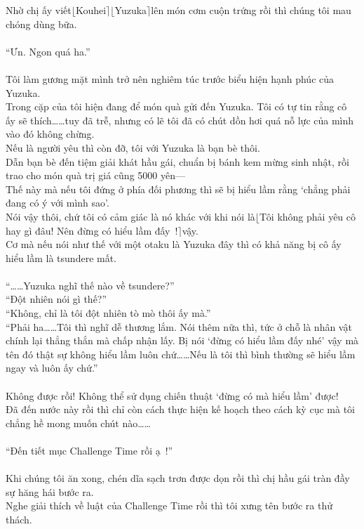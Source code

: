 \documentclass[12pt,a4paper, twosides]{book}
\begin{document}
Nhờ chị ấy viết$\lfloor$Kouhei$\rceil$$\lfloor$Yuzuka$\rceil$lên món cơm cuộn trứng rồi thì chúng tôi mau chóng dùng bữa.\\
\\
“Ưn. Ngon quá ha.”\\
\\
Tôi làm gương mặt mình trở nên nghiêm túc trước biểu hiện hạnh phúc của Yuzuka.\\
Trong cặp của tôi hiện đang để món quà gửi đến Yuzuka. Tôi có tự tin rằng cô ấy sẽ thích……tuy đã trễ, nhưng có lẽ tôi đã có chút dồn hơi quá nỗ lực của mình vào đó không chừng.\\
Nếu là người yêu thì còn đỡ, tôi với Yuzuka là bạn bè thôi.\\
Dẫn bạn bè đến tiệm giải khát hầu gái, chuẩn bị bánh kem mừng sinh nhật, rồi trao cho món quà trị giá cũng 5000 yên—\\
Thế này mà nếu tôi đứng ở phía đối phương thì sẽ bị hiểu lầm rằng ‘chẳng phải đang có ý với mình sao’.\\
Nói vậy thôi, chứ tôi có cảm giác là nó khác với khi nói là$\lfloor$Tôi không phải yêu cô hay gì đâu! Nên đừng có hiểu lầm đấy~!$\rceil$vậy.\\
Cơ mà nếu nói như thế với một otaku là Yuzuka đây thì có khả năng bị cô ấy hiểu lầm là tsundere mất.\\
\\
“……Yuzuka nghĩ thế nào về tsundere?”\\
“Đột nhiên nói gì thế?”\\
“Không, chỉ là tôi đột nhiên tò mò thôi ấy mà.”\\
“Phải ha……Tôi thì nghĩ dễ thương lắm. Nói thêm nữa thì, tức ở chỗ là nhân vật chính lại thẳng thắn mà chấp nhận lấy. Bị nói ‘đừng có hiểu lầm đấy nhé’ vậy mà tên đó thật sự không hiểu lầm luôn chứ……Nếu là tôi thì bình thường sẽ hiểu lầm ngay và luôn ấy chứ.”\\
\\
Không được rồi! Không thể sử dụng chiến thuật ‘đừng có mà hiểu lầm’ được!\\
Đã đến nước này rồi thì chỉ còn cách thực hiện kế hoạch theo cách kỳ cục mà tôi chẳng hề mong muốn chút nào……\\
\\
“Đến tiết mục Challenge Time rồi ạ~!”\\
\\
Khi chúng tôi ăn xong, chén dĩa sạch trơn được dọn rồi thì chị hầu gái tràn đầy sự hăng hái bước ra.\\
Nghe giải thích về luật của Challenge Time rồi thì tôi xưng tên bước ra thử thách.\\
$$
\end{document}
